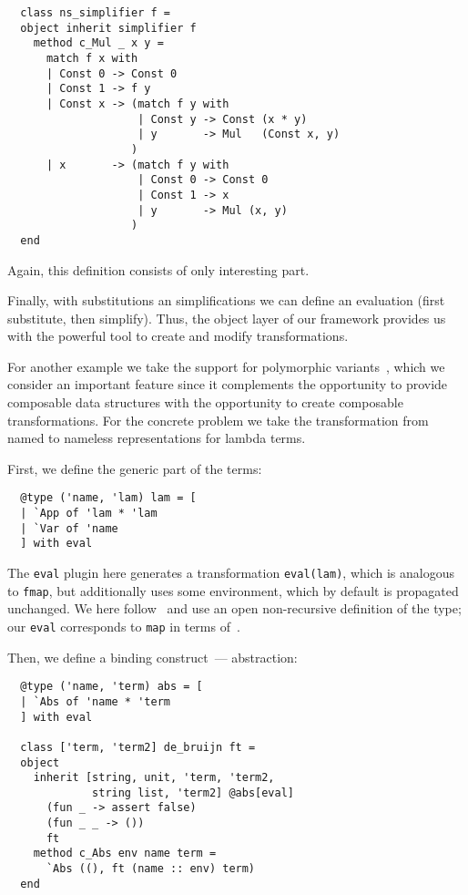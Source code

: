 \documentclass[twocolumn,8pt]{extarticle}
\newcommand{\cd}[1]{\texttt{#1}}
\begin{document}
\begin{lstlisting}
  class ns_simplifier f =
  object inherit simplifier f 
    method c_Mul _ x y =
      match f x with
      | Const 0 -> Const 0
      | Const 1 -> f y
      | Const x -> (match f y with                      
                    | Const y -> Const (x * y)
                    | y       -> Mul   (Const x, y)
                   )
      | x       -> (match f y with
                    | Const 0 -> Const 0
                    | Const 1 -> x
                    | y       -> Mul (x, y)
                   )
  end
\end{lstlisting}

Again, this definition consists of only interesting part.

Finally, with substitutions an simplifications we can define an evaluation (first substitute, then simplify). Thus, the object layer of our framework
provides us with the powerful tool to create and modify transformations.

For another example we take the support for polymorphic variants~\cite{PolyVar,PolyVarReuse}, which we consider an important feature since it complements
the opportunity to provide composable data structures with the opportunity to create composable transformations. For the concrete problem we take the
transformation from named to nameless representations for lambda terms.

First, we define the generic part of the terms:

\begin{lstlisting}
  @type ('name, 'lam) lam = [
  | `App of 'lam * 'lam
  | `Var of 'name
  ] with eval
\end{lstlisting}

The \cd{eval} plugin here generates a transformation \cd{eval(lam)}, which is analogous to \cd{fmap}, but additionally uses some environment, which
by default is propagated unchanged. We here follow~\cite{PolyVarReuse} and use an open non-recursive definition of the type; our \cd{eval} corresponds
to \cd{map} in terms of~\cite{Visitors}.

Then, we define a binding construct~--- abstraction:

\begin{lstlisting}
  @type ('name, 'term) abs = [
  | `Abs of 'name * 'term
  ] with eval
  
  class ['term, 'term2] de_bruijn ft =
  object
    inherit [string, unit, 'term, 'term2,
             string list, 'term2] @abs[eval]
      (fun _ -> assert false)
      (fun _ _ -> ())
      ft
    method c_Abs env name term =
      `Abs ((), ft (name :: env) term)
  end
\end{lstlisting}
\end{document}
